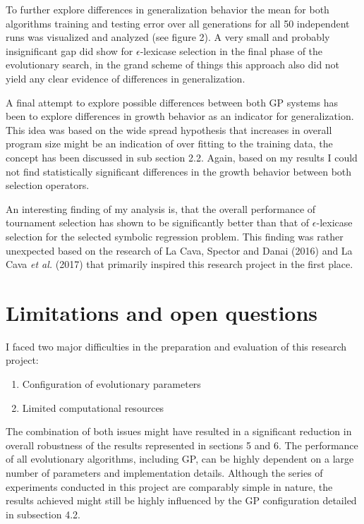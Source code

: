 \documentclass[
  12pt,
]{article}
\providecommand{\tightlist}{%
  \setlength{\itemsep}{0pt}\setlength{\parskip}{0pt}}
\begin{document}
To further explore differences in generalization behavior the mean for
both algorithms training and testing error over all generations for all
50 independent runs was visualized and analyzed (see figure 2). A very
small and probably insignificant gap did show for \(\epsilon\)-lexicase
selection in the final phase of the evolutionary search, in the grand
scheme of things this approach also did not yield any clear evidence of
differences in generalization.

A final attempt to explore possible differences between both GP systems
has been to explore differences in growth behavior as an indicator for
generalization. This idea was based on the wide spread hypothesis that
increases in overall program size might be an indication of over fitting
to the training data, the concept has been discussed in sub section 2.2.
Again, based on my results I could not find statistically significant
differences in the growth behavior between both selection operators.

An interesting finding of my analysis is, that the overall performance
of tournament selection has shown to be significantly better than that
of \(\epsilon\)-lexicase selection for the selected symbolic regression
problem. This finding was rather unexpected based on the research of La
Cava, Spector and Danai (2016) and La Cava \emph{et al.} (2017) that
primarily inspired this research project in the first place.

\hypertarget{limitations-and-open-questions}{%
\section{Limitations and open
questions}\label{limitations-and-open-questions}}

I faced two major difficulties in the preparation and evaluation of this
research project:

\begin{enumerate}
\def\labelenumi{\arabic{enumi}.}
\tightlist
\item
  Configuration of evolutionary parameters
\item
  Limited computational resources
\end{enumerate}

The combination of both issues might have resulted in a significant
reduction in overall robustness of the results represented in sections 5
and 6. The performance of all evolutionary algorithms, including GP, can
be highly dependent on a large number of parameters and implementation
details. Although the series of experiments conducted in this project
are comparably simple in nature, the results achieved might still be
highly influenced by the GP configuration detailed in subsection 4.2.
\end{document}
